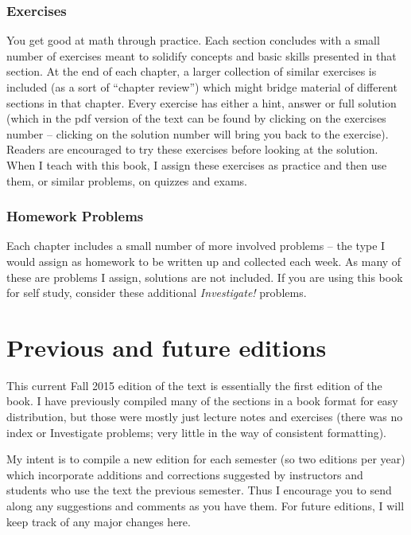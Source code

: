 \subsubsection*{Exercises}

You get good at math through practice.  Each section concludes with a small number of exercises meant to solidify concepts and basic skills presented in that section.  At the end of each chapter, a larger collection of similar exercises is included (as a sort of ``chapter review'') which might bridge material of different sections in that chapter.  Every exercise has either a hint, answer or full solution (which in the pdf version of the text can be found by clicking on the exercises number -- clicking on the solution number will bring you back to the exercise).  Readers are encouraged to try these exercises before looking at the solution.  When I teach with this book, I assign these exercises as practice and then use them, or similar problems, on quizzes and exams.

\subsubsection*{Homework Problems}

Each chapter includes a small number of more involved problems -- the type I would assign as homework to be written up and collected each week.  As many of these are problems I assign, solutions are not included.  If you are using this book for self study, consider these additional \emph{Investigate!} problems.


\section*{Previous and future editions}\label{sec:editions}

This current Fall 2015 edition of the text is essentially the first edition of the book.  I have previously compiled many of the sections in a book format for easy distribution, but those were mostly just lecture notes and exercises (there was no index or Investigate problems; very little in the way of consistent formatting).

My intent is to compile a new edition for each semester (so two editions per year) which incorporate additions and corrections suggested by instructors and students who use the text the previous semester.  Thus I encourage you to send along any suggestions and comments as you have them.  For future editions, I will keep track of any major changes here.


